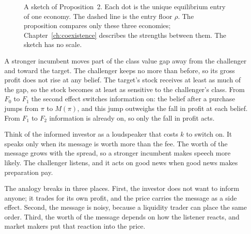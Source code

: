 \begin{figure}[ht]
\centering
{}
\caption{A sketch of Proposition~2. Each dot is the unique equilibrium entry of one economy. The dashed line is
the entry floor \(\rho\). The proposition compares only these three economies; Chapter~\ref{ch:coexistence}
describes the strengths between them. The sketch has no scale.}
\label{fig:ccc-sketch}
\end{figure}

\begin{intuition}
A stronger incumbent moves part of the class value gap away from the challenger and toward the target. The
challenger keeps no more than before, so its gross profit does not rise at any belief. The target's stock receives
at least as much of the gap, so the stock becomes at least as sensitive to the challenger's class. From \(F_0\) to \(F_1\) the second effect switches information
on: the belief after a purchase jumps from \(\pi\) to \(M(\pi)\), and this jump outweighs the fall in profit at
each belief. From \(F_1\) to \(F_2\) information is already on, so only the fall in profit acts.
\end{intuition}

\begin{analogy}
Think of the informed investor as a loudspeaker that costs \(k\) to switch on. It speaks only when its message is
worth more than the fee. The worth of the message grows with the spread, so a stronger incumbent makes speech
more likely. The challenger listens, and it acts on good news when good news makes preparation pay.

The analogy breaks in three places. First, the investor does not want to inform anyone; it trades for its own
profit, and the price carries the message as a side effect. Second, the message is noisy, because a liquidity
trader can place the same order. Third, the worth of the message depends on how the listener reacts, and market
makers put that reaction into the price.
\end{analogy}

